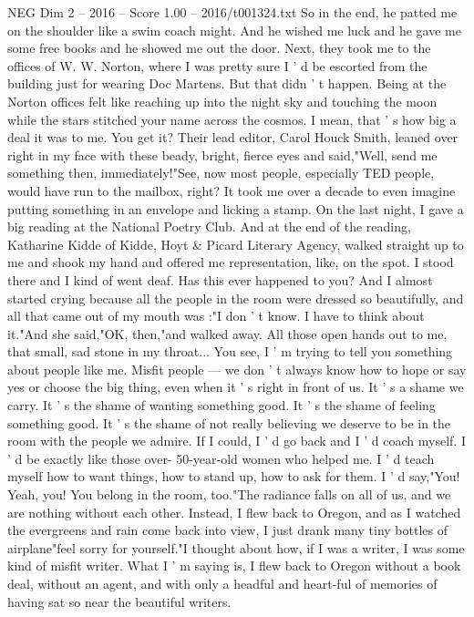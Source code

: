 \begin{textsample}{NEG Dim 2 – 2016 – Score 1.00 – 2016/t001324.txt}
So in the end, he patted me on the shoulder like a swim coach might.
And he wished me luck and he gave me some free books and he showed me out the door.
Next, they took me to the offices of W.
W.
Norton, where I was pretty sure I ' d be escorted from the building just for wearing Doc Martens.
But that didn ' t happen.
Being at the Norton offices felt like reaching up into the night sky and touching the moon while the stars stitched your name across the cosmos.
I mean, that ' s how big a deal it was to me.
You get it?
Their lead editor, Carol Houck Smith, leaned over right in my face with these beady, bright, fierce eyes and said,"Well, send me something then, immediately!"See, now most people, especially TED people, would have run to the mailbox, right?
It took me over a decade to even imagine putting something in an envelope and licking a stamp.
On the last night, I gave a big reading at the National Poetry Club.
And at the end of the reading, Katharine Kidde of Kidde, Hoyt \& Picard Literary Agency, walked straight up to me and shook my hand and offered me representation, like, on the spot.
I stood there and I kind of went deaf.
Has this ever happened to you?
And I almost started crying because all the people in the room were dressed so beautifully, and all that came out of my mouth was :"I don ' t know.
I have to think about it."And she said,"OK, then,"and walked away.
All those open hands out to me, that small, sad stone in my throat...
You see, I ' m trying to tell you something about people like me.
Misfit people — we don ' t always know how to hope or say yes or choose the big thing, even when it ' s right in front of us.
It ' s a shame we carry.
It ' s the shame of wanting something good.
It ' s the shame of feeling something good.
It ' s the shame of not really believing we deserve to be in the room with the people we admire.
If I could, I ' d go back and I ' d coach myself.
I ' d be exactly like those over- 50-year-old women who helped me.
I ' d teach myself how to want things, how to stand up, how to ask for them.
I ' d say,"You!
Yeah, you!
You belong in the room, too."The radiance falls on all of us, and we are nothing without each other.
Instead, I flew back to Oregon, and as I watched the evergreens and rain come back into view, I just drank many tiny bottles of airplane"feel sorry for yourself."I thought about how, if I was a writer, I was some kind of misfit writer.
What I ' m saying is, I flew back to Oregon without a book deal, without an agent, and with only a headful and heart-ful of memories of having sat so near the beautiful writers.

\end{textsample}
